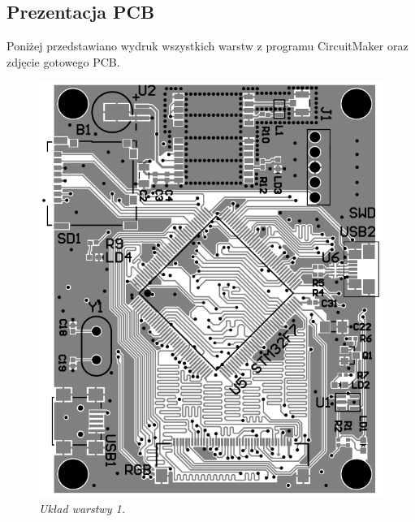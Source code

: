 \documentclass[eng,printmode]{mgr}
\begin{document}
\subsection*{Prezentacja PCB} \label{pcbOverview}
Poniżej przedstawiano wydruk wszystkich warstw z programu CircuitMaker oraz zdjęcie gotowego PCB.
\begin{center}\centering
\begin{figure}[!h]
    \centering
    \includegraphics[width=\textwidth]{pcb/top.png}
    \caption{\textit{Układ warstwy 1.}}
\end{figure}
\end{center}
\end{document}
